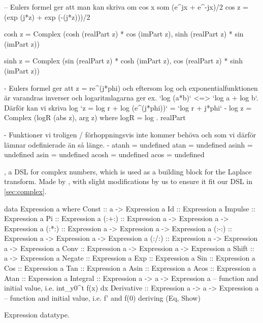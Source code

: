 \begin{codefig}
\begin{code}
-- Eulers formel ger att man kan skriva om cos x som (e^jx + e^-jx)/2
  cos z = (exp (j*z) + exp (-(j*z)))/2

  cosh z = Complex (cosh (realPart z) * cos (imPart z),
                    sinh (realPart z) * sin (imPart z))

  sinh z = Complex (sin (realPart z) * cosh (imPart z),
                    cos (realPart z) * sinh (imPart z))

{-
   Eulers formel ger att z = re^(j*phi) och eftersom log och exponentialfunktionen
   är varandras inverser och logaritmlagarna ger ex. `log (a*b)` <=> `log a + log b`.
   Därför kan vi skriva log `z = log r + log (e^(j*phi))` = `log r + j*phi`
-}
  log z = Complex (logR (abs z), arg z)
    where logR = log . realPart

{-
  Funktioner vi troligen / förhoppningsvis inte kommer behöva och som vi därför lämnar
  odefinierade än så länge.
-}
  atanh = undefined
  atan  = undefined
  asinh = undefined
  asin  = undefined
  acosh = undefined
  acos  = undefined
\end{code}
\caption{, a DSL for complex numbers, which is used as a building block for the Laplace transform. Made by \cite{tssarbete}, with slight modifications by us to ensure it fit our DSL in \ref{sec:complex}.}
\end{codefig}


\begin{codefig}
\begin{code}
data Expression a where
  Const      :: a -> Expression a
  Id         :: Expression a
  Impulse    :: Expression a
  Pi         :: Expression a
  (:+:)      :: Expression a -> Expression a -> Expression a 
  (:*:)      :: Expression a -> Expression a -> Expression a 
  (:-:)      :: Expression a -> Expression a -> Expression a 
  (:/:)      :: Expression a -> Expression a -> Expression a
  Conv       :: Expression a -> Expression a -> Expression a
  Shift      :: a -> Expression a 
  Negate     :: Expression a
  Exp        :: Expression a
  Sin        :: Expression a
  Cos        :: Expression a
  Tan        :: Expression a
  Asin       :: Expression a
  Acos       :: Expression a
  Atan       :: Expression a
  Integral   :: Expression a -> a -> Expression a -- function and initial value, i.e. int_y0^t f(x) dx 
  Derivative :: Expression a -> a -> Expression a -- function and initial value, i.e. f' and f(0)
 deriving (Eq, Show)
\end{code}
\caption{Expression datatype.} \label{code:expression-datatype}
\end{codefig}

